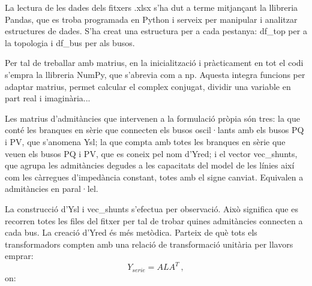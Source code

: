 

La lectura de les dades dels fitxers .xlsx s'ha dut a terme mitjançant la llibreria Pandas, que es troba programada en Python i serveix per manipular i analitzar estructures de dades. S'ha creat una estructura per a cada pestanya: df\_top per a la topologia i df\_bus per als busos. 

Per tal de treballar amb matrius, en la inicialització i pràcticament en tot el codi s'empra la llibreria NumPy, que s'abrevia com a np. Aquesta integra funcions per adaptar matrius, permet calcular el complex conjugat, dividir una variable en part real i imaginària...

Les matrius d'admitàncies que intervenen a la formulació pròpia són tres: la que conté les branques en sèrie que connecten els busos oscil·lants amb els busos PQ i PV, que s'anomena Ysl; la que compta amb totes les branques en sèrie que veuen els busos PQ i PV, que es coneix pel nom d'Yred; i el vector vec\_shunts, que agrupa les admitàncies degudes a les capacitats del model de les línies així com les càrregues d'impedància constant, totes amb el signe canviat. Equivalen a admitàncies en paral·lel.

La construcció d'Ysl i vec\_shunts s'efectua per observació. Això significa que es recorren totes les files del fitxer per tal de trobar quines admitàncies connecten a cada bus. La creació d'Yred és més metòdica. Parteix de què tots els transformadors compten amb una relació de transformació unitària per llavors emprar:
\begin{equation}
    Y_{serie}=ALA^T\ ,
    \label{eq:incidencia}
\end{equation}
on:

